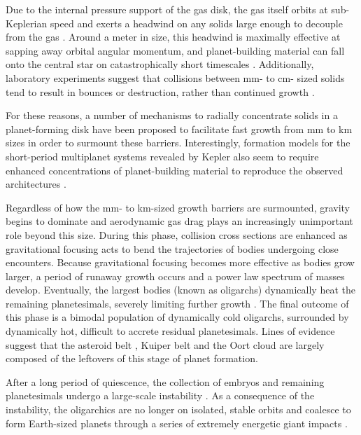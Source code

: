 \documentclass[twocolumn,linenumbers]{aastex63}
\begin{document}
Due to the internal pressure support
of the gas disk, the gas itself orbits at sub-Keplerian speed and
exerts a headwind on any solids large enough to decouple from the gas
\citep{weidenschilling77}. Around a meter in size, this headwind
is maximally effective at sapping away orbital angular momentum, and planet-building material can fall onto the central star on 
catastrophically short timescales \citep{weidenschilling77, nakagawa86}. Additionally, laboratory experiments suggest that 
collisions between mm- to cm- sized solids tend to result in bounces or destruction, rather than continued growth
\citep{blum93, colwell03, beitz11}.

For these reasons, a number of mechanisms to radially concentrate solids in a planet-forming disk have been proposed to 
facilitate fast growth from mm to km sizes \citep{johansen07, lyra08, bai10} in order to surmount these barriers. Interestingly, 
formation models for the short-period multiplanet systems revealed by Kepler \citep{fabrycky14} also seem to require enhanced 
concentrations of planet-building material to reproduce the observed architectures \citep{raymond07, hansen12}.

Regardless of how the mm- to km-sized growth barriers are surmounted, gravity begins to dominate and aerodynamic gas drag 
plays an increasingly unimportant role beyond this size. During this phase, collision cross sections are enhanced as gravitational 
focusing \citep{safronov69} acts to bend the trajectories of bodies undergoing close encounters. Because gravitational focusing 
becomes more effective as bodies grow larger, a period of runaway growth occurs \citep{wetherill89, kokubo96, barnes09} and a 
power law spectrum of masses develop. Eventually, the largest bodies (known as oligarchs) dynamically heat the remaining 
planetesimals, severely limiting further growth \citep{kokubo98}. The final outcome of this phase is a bimodal population of 
dynamically cold oligarchs, surrounded by dynamically hot, difficult to accrete residual planetesimals. Lines of evidence suggest 
that the asteroid belt \textbf{\citep{bottke05, morbidelli09}}, Kuiper belt \textbf{\citep{levison08, sheppard10}} and the Oort cloud \textbf{\citep{levison11}} are largely composed of the leftovers of this stage of planet formation.

After a long period of quiescence, the collection of embryos and
remaining planetesimals undergo a large-scale instability
\citep{chambers98}.
As a consequence of the instability, the oligarchics are no longer
on isolated, stable orbits and coalesce to form Earth-sized planets
through a series of extremely energetic giant 
impacts \citep{kokubo02, raymond05, raymond06}. 
\end{document}
